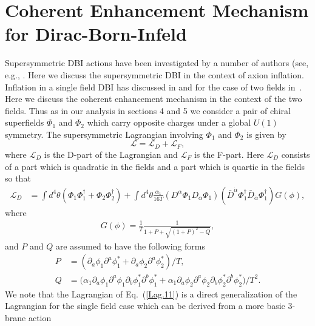 \documentclass[12pt]{article}
\begin{document}
\section{Coherent Enhancement Mechanism for Dirac-Born-Infeld \label{sec:DBI}}
Supersymmetric DBI actions have been investigated by a number of authors
(see, e.g., \cite{Khoury:2010gb,Khoury:2011da,Baumann:2011nk,Baumann:2011nm,Rocek:1997hi,Tseytlin:1999dj,Ito:2007hy,Billo:2008sp,Sasaki:2012ka,Aoki:2016tod}.
Here we discuss the supersymmetric DBI in the context of axion inflation.
Inflation in a single field DBI has discussed in \cite{Sasaki:2012ka} and for the case of two fields in~\cite{Nath:2018xxe}.
Here we discuss the coherent enhancement mechanism in the context of the two fields.
Thus as in our analysis in sections 4 and 5 we consider a pair of chiral superfields $\Phi_1$ and $\Phi_2$ which carry opposite
charges under a global $U(1)$ symmetry.
The supersymmetric Lagrangian involving $\Phi_1$ and $\Phi_2$ is given by
\begin{equation}
  \mathcal{L}= \mathcal{L}_D+\mathcal{L}_{F},
  \label{1.1}
\end{equation}
where $\mathcal{L}_D$ is the D-part of the Lagrangian and $\mathcal{L}_{F}$ is the F-part. Here $\mathcal{L}_D$
consists of a part which is quadratic in the fields and a part which is quartic in the fields so that
\begin{align}
  \mathcal{L}_D
   & = \int d^4\theta \left(\Phi_1 \Phi_1^\dagger + \Phi_2 \Phi_2^\dagger \right)+ \int d^4\theta
  \frac{\alpha_1}{16T}\left(D^\alpha \Phi_1 D_\alpha \Phi_1\right)\left({\bar{D}}^{\dot{\alpha}}\Phi_1^\dagger {\bar{D}}_{\dot{\alpha}}\Phi_1^\dagger \right)
  G(\phi),
  \label{Lag.11}
\end{align}
where
\begin{align}
  G(\phi) = \frac{1}{T}\frac{1}{1+ P +\sqrt{(1+P)^2 -Q}},
\end{align}
and $P$ and $Q$ are assumed to have the following forms
\begin{align}
  P & = (\partial_a\phi_1 \partial^a \phi^*_1 + \partial_a\phi_2 \partial^a \phi^*_2)/T, \nonumber\\
  Q & = \Big(
  \alpha_1\partial_a \phi_1 \partial^a \phi_1 \partial_b \phi^*_1 \partial^b \phi^*_1
  + \alpha_1 \partial_a \phi_2 \partial^a \phi_2 \partial_b \phi^*_2 \partial^b \phi^*_2
  \Big) / T^2.
  \label{Lag.22}
\end{align}
We note that the Lagrangian of Eq.~(\ref{Lag.11}) is a direct generalization of the Lagrangian for the single field
case which can be derived from a more basic 3-brane action
\end{document}
